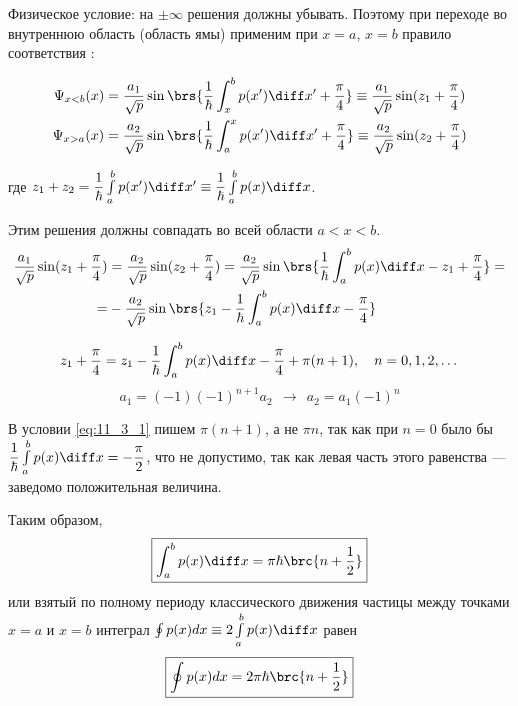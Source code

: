 Физическое условие: на $\pm \infty$ решения должны убывать. Поэтому при переходе во внутреннюю область (область ямы) применим при $x=a$, $x=b$ правило соответствия :

$$
\begin{gathered}
\Psi_{x<b}(x) = \frac{a_1}{\sqrt{p}} \sin\brs{\frac{1}{\hbar} \int_{x}^{b} p(x') \diff x' + \frac{\pi}{4} } \equiv \frac{a_1}{\sqrt{p}} \sin({z_1 + \frac{\pi}{4}}) \\
\Psi_{x>a}(x) = \frac{a_2}{\sqrt{p}} \sin\brs{\frac{1}{\hbar} \int_{a}^{x} p(x') \diff x' + \frac{\pi}{4} } \equiv \frac{a_2}{\sqrt{p}} \sin({z_2 + \frac{\pi}{4}})
\end{gathered}
$$

где $z_1+z_2 = \dfrac{1}{\hbar} \int \limits_{a}^{b} p(x') \diff x' \equiv \dfrac{1}{\hbar} \int \limits_{a}^{b} p(x) \diff x$.

Этим решения должны совпадать во всей области $a < x < b$.
$$
\begin{aligned}
\frac{a_1}{\sqrt{p}} \sin({z_1+\frac{\pi}{4}}) &= \frac{a_2}{\sqrt{p}} \sin({z_2+\frac{\pi}{4}}) = \frac{a_2}{\sqrt{p}} \sin\brs{\frac{1}{\hbar} \int_{a}^{b} p(x) \diff x - z_1 + \frac{\pi}{4}} = \\
=& -\frac{a_2}{\sqrt{p}} \sin\brs{z_1 - \frac{1}{\hbar} \int_{a}^{b} p(x) \diff x - \frac{\pi}{4} }
\end{aligned}
$$

\begin{equation}
\label{eq:11_3_1}
z_1 + \frac{\pi}{4} = z_1 - \frac{1}{\hbar} \int_{a}^{b} p(x) \diff x - \frac{\pi}{4} + \pi(n+1),~~~n = 0, 1, 2, \dots \\
\end{equation}
\begin{equation}
\label{eq:11_3_2}
a_1 = (-1)(-1)^{n+1}a_2  ~~\rightarrow~~ a_2 = a_1 (-1)^n
\end{equation}

В условии \eqref{eq:11_3_1} пишем $\pi (n+1)$, а не $\pi n$, так как при $n=0$ было бы $\dfrac{1}{\hbar}\int \limits_{a}^{b} p(x) \diff x = -\dfrac{\pi}{2}$, что не допустимо, так как левая часть этого равенства --- заведомо положительная величина.

Таким образом, 
\begin{equation}
\label{eq:11_3_3}
\boxed{\int_{a}^{b} p(x) \diff x = \pi\hbar\brc{n+\frac{1}{2}}}
\end{equation}
или взятый по полному периоду классического движения частицы между точками $x=a$ и $x=b$ интеграл $\oint p(x)dx \equiv 2 \int \limits_{a}^{b} p(x) \diff x$ равен
\begin{equation}
\label{eq:11_3_4}
\boxed{\oint p(x)dx = 2\pi\hbar\brc{n+\frac{1}{2}}}
\end{equation}

